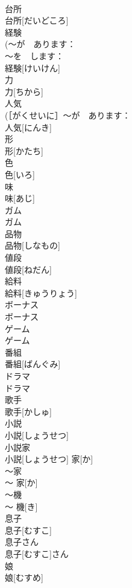 \documentclass[8pt]{extreport}
\begin{document}
\begin{CJK}{UTF8}{min}
\\	台所	
\\	台所[だいどころ]	
\\	経験	
\\	(〜が　あります：
\\	〜を　します：
\\	経験[けいけん]	
\\	力	
\\	力[ちから]	
\\	人気	
\\	(［がくせいに］〜が　あります：
\\	人気[にんき]	
\\	形	
\\	形[かたち]	
\\	色	
\\	色[いろ]	
\\	味	
\\	味[あじ]	
\\	ガム	
\\	ガム	
\\	品物	
\\	品物[しなもの]	
\\	値段	
\\	値段[ねだん]	
\\	給料	
\\	給料[きゅうりょう]	
\\	ボーナス	
\\	ボーナス	
\\	ゲーム	
\\	ゲーム	
\\	番組	
\\	番組[ばんぐみ]	
\\	ドラマ	
\\	ドラマ	
\\	歌手	
\\	歌手[かしゅ]	
\\	小説	
\\	小説[しょうせつ]	
\\	小説家	
\\	小説[しょうせつ] 家[か]	
\\	〜家	
\\	〜 家[か]	
\\	〜機	
\\	〜 機[き]	
\\	息子	
\\	息子[むすこ]	
\\	息子さん	
\\	息子[むすこ]さん	
\\	娘	
\\	娘[むすめ]	

\end{CJK}
\end{document}
